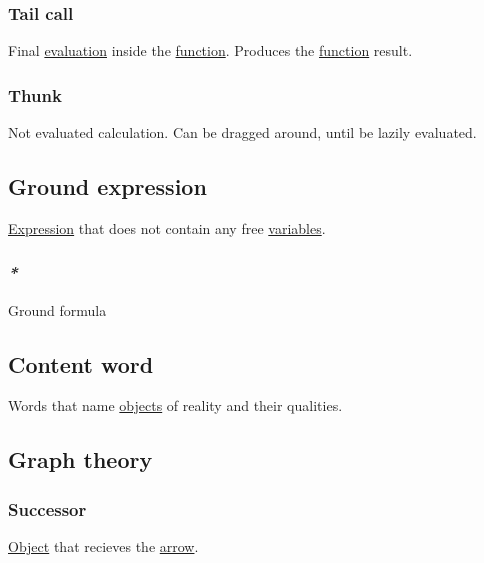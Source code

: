 \documentclass[11pt]{article}
\begin{document}
\subsubsection{\label{orgbe72aee}Tail call}
\label{sec:org4868820}
Final \hyperref[orgbb765d1]{evaluation} inside the \hyperref[orge15bc14]{function}. Produces the \hyperref[orge15bc14]{function} result.\\

\subsubsection{\label{org192b47c}Thunk}
\label{sec:orgc23864a}
Not evaluated calculation. Can be dragged around, until be lazily evaluated.\\

\subsection{\label{org6c27f9c}Ground expression}
\label{sec:orgb6ed3ce}
\hyperref[org9021dd7]{Expression} that does not contain any free \hyperref[orge17f54f]{variables}.\\

\subsubsection{\emph{*}}
\label{sec:org857f94d}

\label{org30f9473}Ground formula\\

\subsection{\label{org73f063a}Content word}
\label{sec:org5767444}
Words that name \hyperref[org363acc2]{objects} of reality and their qualities.\\


\subsection{\label{orga135f94}Graph theory}
\label{sec:org03694a6}
\subsubsection{\label{org67c0a70}Successor}
\label{sec:org280d999}
\hyperref[org4be0e9d]{Object} that recieves the \hyperref[org03967f4]{arrow}.\\
\end{document}
